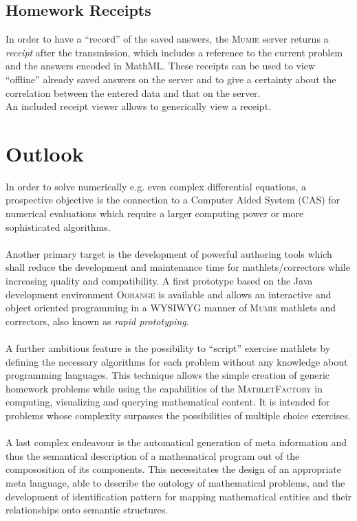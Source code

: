 \documentclass[a4paper,12pt]{article}
\newcommand{\name}[1]{\textsc{#1}}
\newcommand{\mf}{\name{MathletFactory }}
\newcommand{\mumie}{\name{Mumie }}
\newcommand{\oorange}{\name{Oorange }}
\begin{document}
\subsection{Homework Receipts}

In order to have a ``record'' of the saved answers, the \mumie server returns a \textit{receipt} after the
transmission, which includes a reference to the current problem and the answers encoded in MathML.
These receipts can be used to view ``offline'' already saved answers on the server and to
give a certainty about the correlation between the entered data and that on the server.\\
An included receipt viewer allows to generically view a receipt.


\newpage

\section{Outlook}

In order to solve numerically e.g. even complex differential equations, a prospective objective is the
connection to a Computer Aided System (CAS) for numerical evaluations which require a larger computing power
or more sophisticated algorithms.\\
\\
Another primary target is the development of powerful authoring tools which shall reduce the development and 
maintenance time for mathlets/correctors while increasing quality and compatibility. A first prototype based 
on the Java development environment \oorange is available and allows an interactive and object oriented 
programming in a WYSIWYG manner of \mumie mathlets and correctors, also known as \textit{rapid prototyping}.\\
\\
A further ambitious feature is the possibility to ``script'' exercise mathlets by defining the
necessary algorithms for each problem without any knowledge about programming languages. This technique
allows the simple creation of generic homework problems while using the capabilities of the \mf in
computing, visualizing and querying mathematical content. It is intended for problems whose complexity
surpasses the possibilities of multiple choice exercises.\\
\\
A last complex endeavour is the automatical generation of meta information and thus the semantical description
of a mathematical program out of the compososition of its components. This necessitates the design of an
appropriate meta language, able to describe the ontology of mathematical problems, and the development of
identification pattern for mapping mathematical entities and their relationships onto semantic structures.
\end{document}
